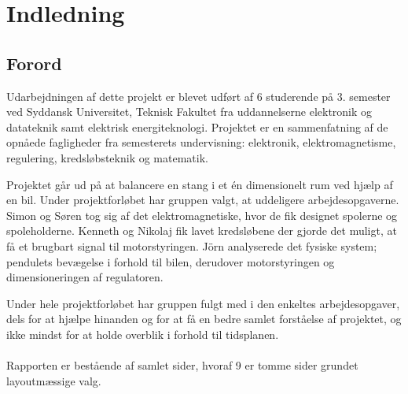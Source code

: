 \chapter{Indledning}

\section{Forord}\label{sec:forord}
Udarbejdningen af dette projekt er blevet udført af 6 studerende på 3. semester ved Syddansk Universitet, Teknisk Fakultet fra uddannelserne elektronik og datateknik samt elektrisk energiteknologi.
Projektet er en sammenfatning af de opnåede fagligheder fra semesterets undervisning: elektronik, elektromagnetisme, regulering, kredsløbsteknik og matematik.

Projektet går ud på at balancere en stang i et én dimensionelt rum ved hjælp af en bil. Under projektforløbet har gruppen valgt, at uddeligere arbejdesopgaverne. Simon og Søren tog sig af det elektromagnetiske, hvor de fik designet spolerne og spoleholderne. Kenneth og Nikolaj fik lavet kredsløbene der gjorde det muligt, at få et brugbart signal til motorstyringen. Jörn analyserede det fysiske system; pendulets bevægelse i forhold til bilen, derudover motorstyringen og dimensioneringen af regulatoren.

Under hele projektforløbet har gruppen fulgt med i den enkeltes arbejdesopgaver, dels for at hjælpe hinanden og for at få en bedre samlet forståelse af projektet, og ikke mindst for at holde overblik i forhold til tidsplanen. 
\\ \\
Rapporten er bestående af samlet \pageref{LastPage} sider, hvoraf 9 er tomme sider grundet layoutmæssige valg. 